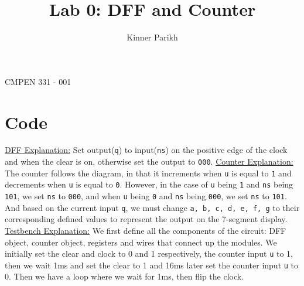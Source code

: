 \documentclass[11pt]{article}
\begin{document}
%
\author{Kinner Parikh}
\title{Lab 0: DFF and Counter}
\maketitle
\begin{center}
    CMPEN 331 - 001
\end{center}

\newpage

\section{Code}

\rmfamily
\underline{DFF Explanation:} Set output(\texttt{q}) to input(\texttt{ns}) on the positive edge of the clock and when 
the clear is on, otherwise set the output to \texttt{000}.\newline\newline
\underline{Counter Explanation:} The counter follows the diagram, in that it increments when \texttt{u} is
equal to \texttt{1} and decrements when \texttt{u} is equal to \texttt{0}. However, in the case of \texttt{u} being \texttt{1} and \texttt{ns} 
being \texttt{101}, we set \texttt{ns} to \texttt{000}, and when \texttt{u} being \texttt{0} and \texttt{ns} being \texttt{000}, we set \texttt{ns} to \texttt{101}.
And based on the current input \texttt{q}, we must change \texttt{a, b, c, d, e, f, g} to their corresponding 
defined values to represent the output on the 7-segment display.\newline\newline
\underline{Testbench Explanation:} We first define all the components of the circuit: DFF object, 
counter object, registers and wires that connect up the modules. We initially set the clear 
and clock to 0 and 1 respectively, the counter input \texttt{u} to 1, then we wait 1ms and set the
clear to 1 and 16ms later set the counter input \texttt{u} to 0. Then we have a loop where we wait 
for 1ms, then flip the clock.\newline

\ttfamily


\newpage

\ttfamily

\end{document}
